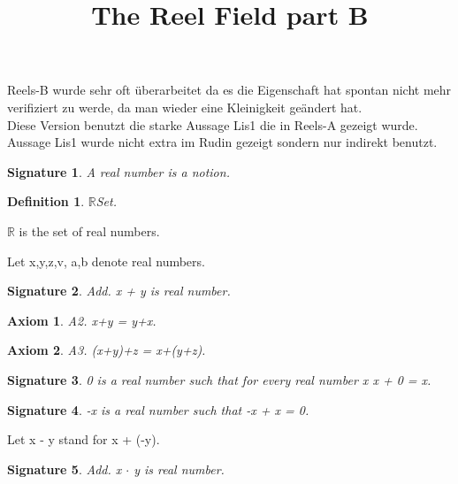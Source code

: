 \documentclass{article}
\newenvironment{forthel}{\begin{leftbar}}{\end{leftbar}}
\newtheorem{axiom}{Axiom}
\newtheorem{definition}{Definition}
\newtheorem{signature}{Signature}
\begin{document}
\title{The Reel Field part B}

\maketitle

Reels-B wurde sehr oft überarbeitet da es die Eigenschaft hat spontan nicht mehr verifiziert zu werde, da man wieder eine Kleinigkeit ge\"andert hat.\\

Diese Version benutzt die starke Aussage Lis1 die in Reels-A gezeigt wurde.\\
Aussage Lis1 wurde nicht extra im Rudin gezeigt sondern nur indirekt benutzt.\\

\begin{forthel}
[set/-s] [element/-s] [number/-s] [integer/-s]

\begin{signature} A real number is a notion.

\end{signature}

\begin{definition} $\mathbb{R}$Set.

\end{definition}
$\mathbb{R}$ is the set of real numbers.

Let x,y,z,v, a,b denote real numbers.



\begin{signature} Add. x + y is real number.

\end{signature}
\begin{axiom} A2. x+y = y+x.

\end{axiom}
\begin{axiom} A3. (x+y)+z = x+(y+z).

\end{axiom}
\begin{signature} 0 is a real number such that for every real number x x + 0 = x.

\end{signature}
\begin{signature} -x is a real number such that -x + x = 0.

\end{signature}

Let x - y stand for x + (-y).

\begin{signature} Add. x $\cdot$ y is real number.


\end{signature}
\end{forthel}
\end{document}
